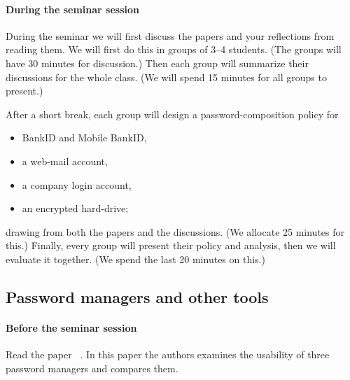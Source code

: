 \paragraph{During the seminar session}

During the seminar we will first discuss the papers and your reflections from 
reading them.
We will first do this in groups of 3--4 students.
(The groups will have 30 minutes for discussion.)
Then each group will summarize their discussions for the whole class.
(We will spend 15 minutes for all groups to present.)

After a short break, each group will design a password-composition policy for
\begin{itemize}
  \item BankID and Mobile BankID,
  \item a web-mail account,
  \item a company login account,
  \item an encrypted hard-drive;
\end{itemize}
drawing from both the papers and the discussions.
(We allocate 25 minutes for this.)
Finally, every group will present their policy and analysis, then we will 
evaluate it together.
(We spend the last 20 minutes on this.)

\subsection{Password managers and other tools}%
\label{password-managers-tools}

\paragraph{Before the seminar session}

Read the paper 
~\cite{UsabilityEvaluationOfPasswordManagers}.
In this paper the authors examines the usability of three password managers and 
compares them.


